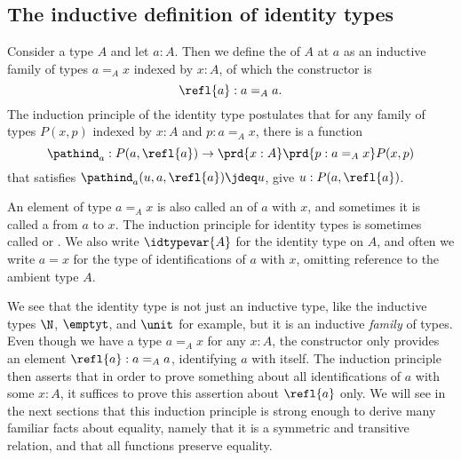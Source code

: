 \subsection{The inductive definition of identity types}

\begin{defn}
  Consider a type $A$ and let $a:A$. Then we define the  of $A$ at $a$ as an inductive family of types $a =_A x$ indexed by $x:A$, of which the constructor is
  \begin{equation*}
    \refl{a}:a=_Aa.
  \end{equation*}
  The induction principle of the identity type postulates that for any family of types $P(x,p)$ indexed by $x:A$ and $p:a=_A x$, there is a function
  \begin{equation*}
    \pathind_a:P(a,\refl{a}) \to \prd{x:A}\prd{p:a=_A x} P(x,p)
  \end{equation*}
  that satisfies $\pathind_a(u,a,\refl{a})\jdeq u$, give $u:P(a,\refl{a})$.

  An element of type $a=_A x$ is also called an  of $a$ with $x$, and sometimes it is called a  from $a$ to $x$.
The induction principle for identity types is sometimes called  or . We also write $\idtypevar{A}$ for the identity type on $A$, and often we write $a=x$ for the type of identifications of $a$ with $x$, omitting reference to the ambient type $A$.
\end{defn}

\begin{rmk}
  We see that the identity type is not just an inductive type, like the inductive types $\N$, $\emptyt$, and $\unit$ for example, but it is an inductive \emph{family} of types. Even though we have a type $a=_A x$ for any $x:A$, the constructor only provides an element $\refl{a}:a=_A a$, identifying $a$ with itself. The induction principle then asserts that in order to prove something about all identifications of $a$ with some $x:A$, it suffices to prove this assertion about $\refl{a}$ only. We will see in the next sections that this induction principle is strong enough to derive many familiar facts about equality, namely that it is a symmetric and transitive relation, and that all functions preserve equality.
\end{rmk}

